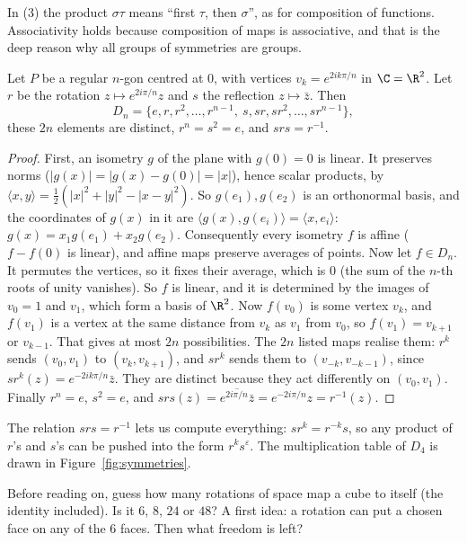 In (3) the product $\sigma\tau$ means ``first $\tau$, then $\sigma$'', as for composition of functions. Associativity holds because composition of maps is associative, and that is the deep reason why all groups of symmetries are groups.

\begin{proposition}\label{prop:dihedral}
Let $P$ be a regular $n$-gon centred at $0$, with vertices $v_k=e^{2ik\pi/n}$ in $\C=\R^2$. Let $r$ be the rotation $z\mapsto e^{2i\pi/n}z$ and $s$ the reflection $z\mapsto\bar z$. Then
\[
D_n=\{e,r,r^2,\dots,r^{n-1},\ s,sr,sr^2,\dots,sr^{n-1}\},
\]
these $2n$ elements are distinct, $r^n=s^2=e$, and $srs=r^{-1}$.
\end{proposition}
\begin{proof}
First, an isometry $g$ of the plane with $g(0)=0$ is linear. It preserves norms ($|g(x)|=|g(x)-g(0)|=|x|$), hence scalar products, by $\langle x,y\rangle=\frac12\left(|x|^2+|y|^2-|x-y|^2\right)$. So $g(e_1),g(e_2)$ is an orthonormal basis, and the coordinates of $g(x)$ in it are $\langle g(x),g(e_i)\rangle=\langle x,e_i\rangle$: $g(x)=x_1g(e_1)+x_2g(e_2)$. Consequently every isometry $f$ is affine ($f-f(0)$ is linear), and affine maps preserve averages of points.
Now let $f\in D_n$. It permutes the vertices, so it fixes their average, which is $0$ (the sum of the $n$-th roots of unity vanishes). So $f$ is linear, and it is determined by the images of $v_0=1$ and $v_1$, which form a basis of $\R^2$. Now $f(v_0)$ is some vertex $v_k$, and $f(v_1)$ is a vertex at the same distance from $v_k$ as $v_1$ from $v_0$, so $f(v_1)=v_{k+1}$ or $v_{k-1}$. That gives at most $2n$ possibilities. The $2n$ listed maps realise them: $r^k$ sends $(v_0,v_1)$ to $(v_k,v_{k+1})$, and $sr^{k}$ sends them to $(v_{-k},v_{-k-1})$, since $sr^k(z)=e^{-2ik\pi/n}\bar z$. They are distinct because they act differently on $(v_0,v_1)$. Finally $r^n=e$, $s^2=e$, and $srs(z)=\overline{e^{2i\pi/n}\bar z}=e^{-2i\pi/n}z=r^{-1}(z)$.
\end{proof}

The relation $srs=r^{-1}$ lets us compute everything: $sr^k=r^{-k}s$, so any product of $r$'s and $s$'s can be pushed into the form $r^ks^\varepsilon$. The multiplication table of $D_4$ is drawn in Figure~\ref{fig:symmetries}.

\begin{think}
Before reading on, guess how many rotations of space map a cube to itself (the identity included). Is it $6$, $8$, $24$ or $48$? A first idea: a rotation can put a chosen face on any of the $6$ faces. Then what freedom is left?
\end{think}

